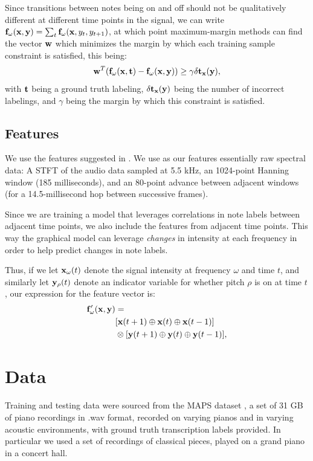 \documentclass{article}
\begin{document}
Since transitions between notes being on and off should not be qualitatively
different at different time points in the signal, we can write
$\mathbf{f}_{\omega}(\mathbf{x},\mathbf{y}) = \sum_t \mathbf{f}_{\omega}(\mathbf{x},y_t,y_{t+1})$,
at which point maximum-margin methods can find the vector $\mathbf{w}$ which minimizes
the margin by which each training sample constraint is satisfied,
this being:
\[ \mathbf{w}^T(\mathbf{f}_{\omega}(\mathbf{x},\mathbf{t}) - \mathbf{f}_{\omega}(\mathbf{x},\mathbf{y})) \ge \gamma \delta\mathbf{t}_{\mathbf{x}}(\mathbf{y}), \]
with $\mathbf{t}$ being a ground truth labeling, $\delta\mathbf{t}_{\mathbf{x}}(\mathbf{y})$ being the number
of incorrect labelings, and $\gamma$ being the margin by which this constraint
is satisfied.

\subsection{Features}\label{features}
We use the features suggested in \cite{poliner2006discriminative}.
We use as our features essentially raw spectral data:
A STFT of the audio data sampled at 5.5 kHz,
an 1024-point Hanning window (185 milliseconds),
and an 80-point advance between adjacent windows
(for a 14.5-millisecond hop between successive frames).

Since we are training a model that leverages correlations in note labels
between adjacent time points, we also include the features from adjacent
time points. This way the graphical model can leverage \emph{changes} in
intensity at each frequency in order to help predict changes in note labels.

Thus, if we let $\mathbf{x}_{\omega}(t)$ denote the signal intensity at frequency
$\omega$ and time $t$, and similarly let $\mathbf{y}_{\rho}(t)$ denote an indicator
variable for whether pitch $\rho$ is on at time $t$, our expression for the
feature vector is:
\begin{align*}
  \mathbf{f}'_{\omega}(\mathbf{x},\mathbf{y}) &= 
      \\& [\mathbf{x}(t+1) \oplus \mathbf{x}(t) \oplus \mathbf{x}(t-1)]
      \\&\otimes [\mathbf{y}(t+1) \oplus \mathbf{y}(t) \oplus \mathbf{y}(t-1)],
\end{align*}

\section{Data}
Training and testing data were sourced from the MAPS dataset 
\cite{emiya2010multipitch}, a set of 31 GB of piano recordings in .wav format,
recorded on varying pianos and in varying acoustic environments, with ground
truth transcription labels provided. In particular we used a set of recordings
of classical pieces, played on a grand piano in a concert hall.
\end{document}
